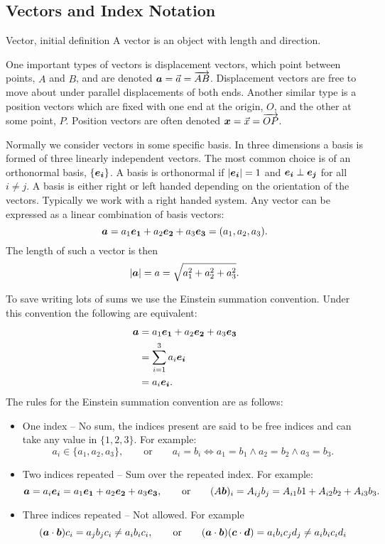 \documentclass[a4paper]{article}
\begin{document}
    \subsection{Vectors and Index Notation}
    \begin{definition}{Vector, initial definition}{}
        A vector is an object with length and direction.
    \end{definition}
    One important types of vectors is displacement vectors, which point between points, \(A\) and \(B\), and are denoted \(\bm{a} = \vec{a} = \overrightarrow{AB}\).
    Displacement vectors are free to move about under parallel displacements of both ends.
    Another similar type is a position vectors which are fixed with one end at the origin, \(O\), and the other at some point, \(P\).
    Position vectors are often denoted \(\bm{x} = \vec{x} = \overrightarrow{OP}\).
    
    Normally we consider vectors in some specific basis.
    In three dimensions a basis is formed of three linearly independent vectors.
    The most common choice is of an orthonormal basis, \(\{\bm{e_{i}}\}\).
    A basis is orthonormal if \(\abs{\bm{e_{i}}} = 1\) and \(\bm{e_{i}}\perp\bm{e_{j}}\) for all \(i\ne j\).
    A basis is either right or left handed depending on the orientation of the vectors.
    Typically we work with a right handed system.
    Any vector can be expressed as a linear combination of basis vectors:
    \[\bm{a} = a_1\bm{e_{1}} + a_2\bm{e_{2}} + a_3\bm{e_{3}} = (a_1, a_2, a_3).\]
    The length of such a vector is then
    \[\abs{\bm{a}} = a = \sqrt{a_1^2 + a_2^2 + a_3^2}.\]
    
    To save writing lots of sums we use the Einstein summation convention.
    Under this convention the following are equivalent:
    \begin{align*}
        \bm{a} &= a_1\bm{e_{1}} + a_2\bm{e_{2}} + a_3\bm{e_{3}}\\
        &= \sum_{i=1}^{3} a_i\bm{e_{i}}\\
        &= a_i\bm{e_{i}}.
    \end{align*}
    The rules for the Einstein summation convention are as follows:
    \begin{itemize}
        \item One index -- No sum, the indices present are said to be free indices and can take any value in \(\{1, 2, 3\}\).
        For example:
        \[a_i \in \{a_1, a_2, a_3\}, \qquad\text{or}\qquad a_i = b_i \iff a_1 = b_1 \wedge a_2 = b_2 \wedge a_3 = b_3.\]
        \item Two indices repeated -- Sum over the repeated index.
        For example:
        \[\bm{a} = a_i\bm{e_{i}} = a_1\bm{e_{1}} + a_2\bm{e_{2}} + a_3\bm{e_{3}}, \qquad\text{or}\qquad (A\bm{b})_i = A_{ij}b_j = A_{i1}b1 + A_{i2}b_2 + A_{i3}b_3.\]
        \item Three indices repeated -- Not allowed.
        For example
        \[(\bm{a}\cdot\bm{b})c_i = a_jb_jc_i \ne a_ib_ic_i, \qquad\text{or}\qquad (\bm{a}\cdot\bm{b})(\bm{c}\cdot\bm{d}) = a_ib_ic_jd_j \ne a_ib_ic_id_i\]
    \end{itemize}
   
\end{document}
